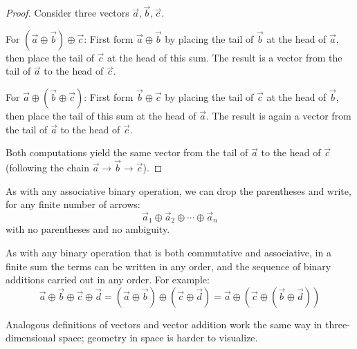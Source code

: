 \begin{proof}
    Consider three vectors $\vec{a}, \vec{b}, \vec{c}$. 
    
    For $(\vec{a} \oplus \vec{b}) \oplus \vec{c}$: First form $\vec{a} \oplus \vec{b}$ by placing the tail of $\vec{b}$ at the head of $\vec{a}$, then place the tail of $\vec{c}$ at the head of this sum. The result is a vector from the tail of $\vec{a}$ to the head of $\vec{c}$.
    
    For $\vec{a} \oplus (\vec{b} \oplus \vec{c})$: First form $\vec{b} \oplus \vec{c}$ by placing the tail of $\vec{c}$ at the head of $\vec{b}$, then place the tail of this sum at the head of $\vec{a}$. The result is again a vector from the tail of $\vec{a}$ to the head of $\vec{c}$.
    
    Both computations yield the same vector from the tail of $\vec{a}$ to the head of $\vec{c}$ (following the chain $\vec{a} \to \vec{b} \to \vec{c}$).
\end{proof}

\begin{note}
    As with any associative binary operation, we can drop the parentheses and write, for any finite number of arrows:
    \[
    \vec{a}_1 \oplus \vec{a}_2 \oplus \cdots \oplus \vec{a}_n
    \]
    with no parentheses and no ambiguity.
\end{note}

\begin{note}
    As with any binary operation that is both commutative and associative, in a finite sum the terms can be written in any order, and the sequence of binary additions carried out in any order. For example:
    \[
    \vec{a} \oplus \vec{b} \oplus \vec{c} \oplus \vec{d} = (\vec{a} \oplus \vec{b}) \oplus (\vec{c} \oplus \vec{d}) = \vec{a} \oplus (\vec{c} \oplus (\vec{b} \oplus \vec{d}))
    \]
\end{note}

\begin{note}
    Analogous definitions of vectors and vector addition work the same way in three-dimensional space; geometry in space is harder to visualize.
\end{note}